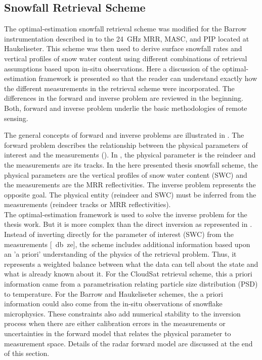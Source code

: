 
\subsection{Snowfall Retrieval Scheme}\label{sec:ret_scheme}

The optimal-estimation snowfall retrieval scheme was modified for the Barrow instrumentation described in \citet{cooper_variational_2017} to the \SI{24}{\giga\hertz} MRR, MASC, and PIP located at Haukeliseter. This scheme was then used to derive surface snowfall rates and vertical profiles of snow water content using different combinations of retrieval assumptions based upon in-situ observations.
Here a discussion of the optimal-estimation framework is presented so that the reader can understand exactly how the different measurements in the retrieval scheme were incorporated. The differences in the forward and inverse problem are reviewed in the beginning. Both, forward and inverse problem underlie the basic methodologies of remote sensing.
\par\medskip\noindent
The general concepts of forward and inverse problems are illustrated in .  The forward problem describes the relationship between the physical parameters of interest and the measurements (). In , the physical parameter is the reindeer and the measurements are its tracks. In the here presented thesis snowfall scheme, the physical parameters are the vertical profiles of snow water content (SWC) and the measurements are the MRR reflectivities.  The inverse problem represents the opposite goal.  The physical entity (reindeer and SWC) must be inferred from the measurements (reindeer tracks or MRR reflectivities).
\\
The optimal-estimation framework is used to solve the inverse problem for the thesis work. But it is more complex than the direct inversion as represented in . Instead of inverting directly for the parameter of interest (SWC) from the measurements [\SI{}{\decibel ze}], the scheme includes additional information based upon an 'a priori' understanding of the physics of the retrieval problem. Thus, it represents a weighted balance between what the data can tell about the state and what is already known about it. For the CloudSat retrieval scheme, this a priori information came from a parametrisation relating particle size distribution (PSD) to temperature. For the Barrow and Haukeliseter schemes, the a priori information could also come from the in-situ observations of snowflake microphysics. These constraints also add numerical stability to the inversion process when there are either calibration errors in the measurements or uncertainties in the forward model that relates the physical parameter to measurement space. Details of the radar forward model are discussed at the end of this section.
